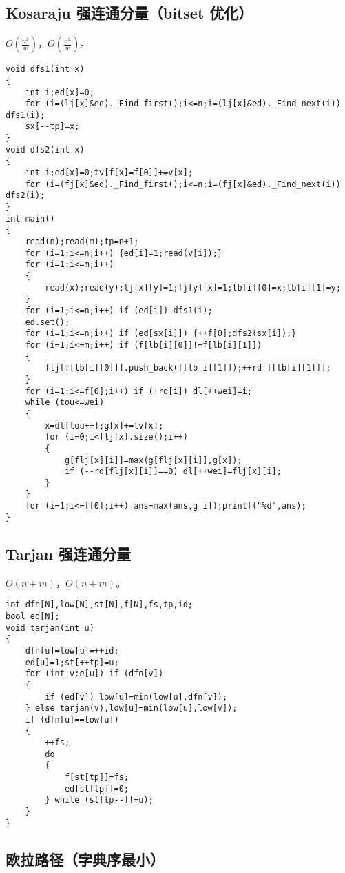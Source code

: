 \documentclass[12pt]{ctexart}
\begin{document}
\subsection{Kosaraju 强连通分量（bitset 优化）}

$O(\frac{n^2}w)$，$O(\frac {n^2}w)$。

\begin{lstlisting}
void dfs1(int x)
{
	int i;ed[x]=0;
	for (i=(lj[x]&ed)._Find_first();i<=n;i=(lj[x]&ed)._Find_next(i)) dfs1(i);
	sx[--tp]=x;
}
void dfs2(int x)
{
	int i;ed[x]=0;tv[f[x]=f[0]]+=v[x];
	for (i=(fj[x]&ed)._Find_first();i<=n;i=(fj[x]&ed)._Find_next(i)) dfs2(i);
}
int main()
{
	read(n);read(m);tp=n+1;
	for (i=1;i<=n;i++) {ed[i]=1;read(v[i]);}
	for (i=1;i<=m;i++)
	{
		read(x);read(y);lj[x][y]=1;fj[y][x]=1;lb[i][0]=x;lb[i][1]=y;
	}
	for (i=1;i<=n;i++) if (ed[i]) dfs1(i);
	ed.set();
	for (i=1;i<=n;i++) if (ed[sx[i]]) {++f[0];dfs2(sx[i]);}
	for (i=1;i<=m;i++) if (f[lb[i][0]]!=f[lb[i][1]])
	{
		flj[f[lb[i][0]]].push_back(f[lb[i][1]]);++rd[f[lb[i][1]]];
	}
	for (i=1;i<=f[0];i++) if (!rd[i]) dl[++wei]=i;
	while (tou<=wei)
	{
		x=dl[tou++];g[x]+=tv[x];
		for (i=0;i<flj[x].size();i++)
		{
			g[flj[x][i]]=max(g[flj[x][i]],g[x]);
			if (--rd[flj[x][i]]==0) dl[++wei]=flj[x][i];
		}
	}
	for (i=1;i<=f[0];i++) ans=max(ans,g[i]);printf("%d",ans); 
}

\end{lstlisting}

\subsection{Tarjan 强连通分量}

$O(n+m)$，$O(n+m)$。

\begin{lstlisting}
int dfn[N],low[N],st[N],f[N],fs,tp,id;
bool ed[N];
void tarjan(int u)
{
	dfn[u]=low[u]=++id;
	ed[u]=1;st[++tp]=u;
	for (int v:e[u]) if (dfn[v])
	{
		if (ed[v]) low[u]=min(low[u],dfn[v]);
	} else tarjan(v),low[u]=min(low[u],low[v]);
	if (dfn[u]==low[u])
	{
		++fs;
		do
		{
			f[st[tp]]=fs;
			ed[st[tp]]=0;
		} while (st[tp--]!=u);
	}
}

\end{lstlisting}

\subsection{欧拉路径（字典序最小）}
\end{document}
